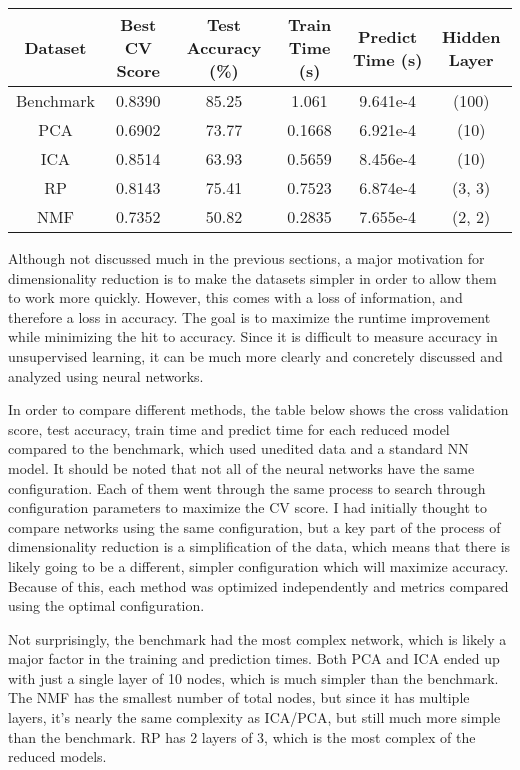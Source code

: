 \documentclass[
	letterpaper, %
]{mlreport}
\begin{document}
\begin{center}
	\begin{tabular}{|c||c|c|c|c|c|}
	 \hline
	 Dataset & Best CV Score & Test Accuracy (\%) & Train Time (s) & Predict Time (s) & Hidden Layer \\
	 \hline\hline
	 Benchmark & 0.8390 & 85.25 & 1.061 & 9.641e-4 & (100) \\
	 \hline
	 PCA & 0.6902 & 73.77 & 0.1668 & 6.921e-4 & (10) \\
	 \hline
	 ICA & 0.8514 & 63.93 & 0.5659 & 8.456e-4 & (10) \\
	 \hline
	 RP & 0.8143 & 75.41 & 0.7523 & 6.874e-4 & (3, 3) \\
	 \hline
	 NMF & 0.7352 & 50.82 & 0.2835 & 7.655e-4 & (2, 2)\\
	 \hline
	\end{tabular}
	\label{table:table1}
\end{center}

Although not discussed much in the previous sections, a major motivation for dimensionality reduction is to make the datasets simpler in order to allow them to work more quickly. However, this comes with a loss of information, and therefore a loss in accuracy. The goal is to maximize the runtime improvement while minimizing the hit to accuracy. Since it is difficult to measure accuracy in unsupervised learning, it can be much more clearly and concretely discussed and analyzed using neural networks.

In order to compare different methods, the table below shows the cross validation score, test accuracy, train time and predict time for each reduced model compared to the benchmark, which used unedited data and a standard NN model. It should be noted that not all of the neural networks have the same configuration. Each of them went through the same process to search through configuration parameters to maximize the CV score. I had initially thought to compare networks using the same configuration, but a key part of the process of dimensionality reduction is a simplification of the data, which means that there is likely going to be a different, simpler configuration which will maximize accuracy. Because of this, each method was optimized independently and metrics compared using the optimal configuration.

Not surprisingly, the benchmark had the most complex network, which is likely a major factor in the training and prediction times. Both PCA and ICA ended up with just a single layer of 10 nodes, which is much simpler than the benchmark. The NMF has the smallest number of total nodes, but since it has multiple layers, it's nearly the same complexity as ICA/PCA, but still much more simple than the benchmark. RP has 2 layers of 3, which is the most complex of the reduced models.
\end{document}
